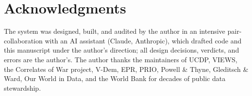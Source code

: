 \documentclass[11pt]{article}
\begin{document}
\section*{Acknowledgments}

The system was designed, built, and audited by the author in an intensive
pair-collaboration with an AI assistant (Claude, Anthropic), which drafted
code and this manuscript under the author's direction; all design decisions,
verdicts, and errors are the author's. The author thanks the maintainers of
UCDP, VIEWS, the Correlates of War project, V-Dem, EPR, PRIO, Powell \&
Thyne, Gleditsch \& Ward, Our World in Data, and the World Bank for decades
of public data stewardship.



\end{document}
